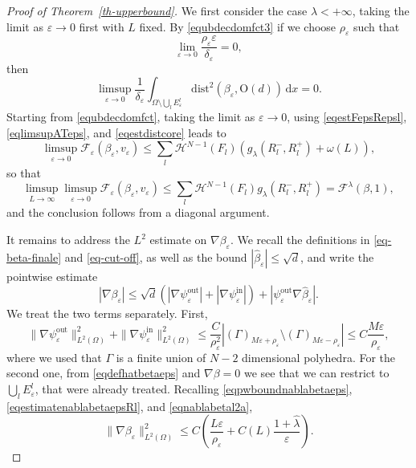 \documentclass[a4paper,reqno]{amsart}
\newcommand\calH{\mathcal{H}}
\newcommand\dist{{\mathrm{dist}}}
\newcommand\out{{\mathrm{out}}}
\newcommand\iin{{\mathrm{in}}}
\newcommand\eps{{\varepsilon}}
\theoremstyle{remark}
\newcommand\dx{{\,\mathrm{d}x}}
\newcommand{\F}{\mathcal{F}}
\newcommand{\On}{\mathrm{O}(d)}
\numberwithin{equation}{section}
\begin{document}
\begin{proof}[Proof of Theorem~\ref{th-upperbound}]
	We first consider the case $\lambda<+\infty$, taking the limit as $\eps\to 0$ first with $L$ fixed.
By \eqref{equbdecdomfct3}
		if we  choose $\rho_\eps$ such that
		\begin{equation}\label{eqassrhoeps}
				\lim_{\eps\to0} \frac{\rho_\eps \eps}{\delta_\eps}=0,
			\end{equation}
		then
		\begin{equation}\label{eqestdistcore}
				\limsup_{\eps\to0}\frac1{\delta_\eps} \int_{\Omega\setminus \bigcup_l E^l_\eps}
				\dist^2(\beta_\eps, \On)\dx=0.
			\end{equation}
	Starting from \eqref{equbdecdomfct}, taking the limit as $\eps\to0$, using
	\eqref{eqestFepsRepsl}, \eqref{eqlimsupATeps}, and
	\eqref{eqestdistcore} leads to
	\begin{equation*}
		\limsup_{\eps\to0}
		\F_\eps(\beta_\eps, v_\eps)
		\le \sum_l \calH^{N-1}(F_l)
		\left( g_\lambda(R^-_l,R^+_l)+ \omega(L)\right),
	\end{equation*}
	so that 
	\begin{equation*}
		\limsup_{L\to\infty}
		\limsup_{\eps\to0}
		\F_\eps(\beta_\eps, v_\eps)
		\le \sum_l \calH^{N-1}(F_l)
		g_\lambda(R^-_l,R^+_l)=\F^\lambda(\beta,1),
	\end{equation*}
	and the conclusion follows from a diagonal argument.
	
	It remains to address
	the $L^2$ estimate on $\nabla \beta_\eps$.
	We recall the definitions in \eqref{eq-beta-finale} and \eqref{eq-cut-off}, as well as
	the bound $|\widehat\beta_\eps|\le\sqrt d$, and write the pointwise estimate
	\begin{equation}\label{eqpwboundnablabetaeps}
		|\nabla\beta_\eps|\le \sqrt d (|\nabla \psi^\out_\eps|+|\nabla\psi^\iin_\eps|)
		+ |\psi^\out_\eps \nabla \widehat \beta_\eps|.
	\end{equation}
	We treat the two terms separately. First,
	\begin{equation}\label{eqnablabetal2a}
		\|\nabla \psi^\out_\eps\|_{L^2(\Omega)}^2+	\|\nabla \psi^\iin_\eps\|_{L^2(\Omega)}^2
		\le \frac{C}{\rho_\eps^2}
		|(\Gamma)_{M\eps+\rho_\eps}\setminus(\Gamma)_{M\eps-\rho_\eps}|\le C\frac{M\eps}{\rho_\eps},
	\end{equation}
	where we used that $\Gamma$ is a finite union of $N-2$ dimensional polyhedra.
	For the second one, from \eqref{eqdefhatbetaeps} and $\nabla\beta=0$ we see that we can restrict to $\bigcup_l E^l_\eps$, that were already treated.
	Recalling
	\eqref{eqpwboundnablabetaeps},
	\eqref{eqestimatenablabetaepsRl}, and
	\eqref{eqnablabetal2a},
	\begin{equation}\label{eqL2estimate}
		\|\nabla\beta_\eps\|_{L^2(\Omega)}^2\le
		C\left( \frac{L\eps}{\rho_\eps}+C(L)\frac{1+\widehat\lambda}{\eps}\right).
	\end{equation}
	

\end{proof}
\end{document}
